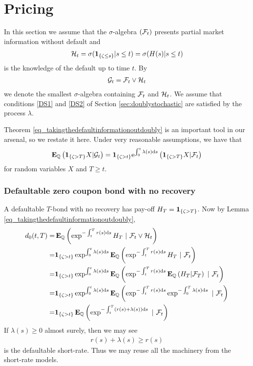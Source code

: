\section{Pricing}

 \textcite[pp. 790--792]{brigo2007interest}

In this section we assume that the $\sigma$-algebra $(\mathcal{F}_t)$ presents partial market information without default and 
\begin{align}
\mathcal{H}_t = \sigma( \boldsymbol{1}_{ \{\zeta \leq s \} } | s \leq t ) = \sigma( H(s) | s \leq t ) 
\end{align}
is the knowledge of the default up to time $t$. By
\begin{align}
\mathcal{G}_t = \mathcal{F}_t \vee \mathcal{H}_t
\end{align}
we denote the smallest $\sigma$-algebra containing $\mathcal{F}_t$ and $\mathcal{H}_t$. We assume that conditions \ref{DS1} and \ref{DS2} of Section \ref{sec:doublystochastic} are satisfied by the process $\lambda$.

Theorem \ref{eq_takingthedefaultinformationoutdoubly} is an important tool in our arsenal, so we restate it here. Under very reasonable assumptions, we have that
	\begin{align}
		\operatorname{\boldsymbol{\mathrm{E}}}_{\mathbb{Q}} \left( \boldsymbol{1}_{ \{ \zeta > T \} } X | \mathcal{G}_t  \right) = \boldsymbol{1}_{ \{ \zeta > t \} } \mathrm{e}^{ \int_0^t \lambda(s) \mathrm{d} s }  \left( \boldsymbol{1}_{ \{ \zeta > T \} } X | \mathcal{F}_t \right)
	\end{align}
for random variables $X$ and $T \geq t$.

\subsubsection{Defaultable zero coupon bond with no recovery}

A defaultable $T$-bond with no recovery has pay-off $H_T = \boldsymbol{1}_{\{\zeta > T\}}$. Now by Lemma \ref{eq_takingthedefaultinformationoutdoubly}, 
  \begin{align}
    d_0(t,T) =& \operatorname{\boldsymbol{\mathrm{E}}}_{\mathbb{Q}} \left( \exp^{ - \int_t^T r(s) \mathrm{d} s } H_T \ | \ \mathcal{F}_t \vee \mathcal{H}_t \right) \\
    =& \boldsymbol{1}_{\{\zeta > t\}} \exp^{ \int_0^t \lambda (s) \mathrm{d} s } \operatorname{\boldsymbol{\mathrm{E}}}_{\mathbb{Q}} \left( \exp^{ - \int_t^T r(s) \mathrm{d} s } H_T \ | \ \mathcal{F}_t \right) \\
    =& \boldsymbol{1}_{\{\zeta > t\}} \exp^{ \int_0^t \lambda (s) \mathrm{d} s } \operatorname{\boldsymbol{\mathrm{E}}}_{\mathbb{Q}} \left( \exp^{ - \int_t^T r(s) \mathrm{d} s } \operatorname{\boldsymbol{\mathrm{E}}}_{\mathbb{Q}} \left( H_T | \mathcal{F}_T \right) \ | \ \mathcal{F}_t \right) \\
    =& \boldsymbol{1}_{\{\zeta > t\}} \exp^{ \int_0^t \lambda (s) \mathrm{d} s } \operatorname{\boldsymbol{\mathrm{E}}}_{\mathbb{Q}} \left( \exp^{ - \int_t^T r(s) \mathrm{d} s } \exp^{ - \int_0^T \lambda (s) \mathrm{d} s }  \ | \ \mathcal{F}_t \right) \\
=& \boldsymbol{1}_{\{\zeta > t\}} \operatorname{\boldsymbol{\mathrm{E}}}_{\mathbb{Q}} \left( \exp^{ - \int_t^T (r(s) + \lambda(s)) \mathrm{d} s } \ | \ \mathcal{F}_t \right)
  \end{align}
If $\lambda(s) \geq 0$ almost surely, then we may see
  \begin{align}
  r(s) + \lambda (s) \geq r(s)
  \end{align}
is the defaultable short-rate. Thus we may reuse all the machinery from the short-rate models.

